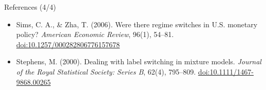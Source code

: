 \begin{frame}{References (4/4)}
\begin{itemize}
    \item Sims, C. A., \& Zha, T. (2006). Were there regime switches in U.S. monetary policy? \textit{American Economic Review}, 96(1), 54--81. \href{https://doi.org/10.1257/000282806776157678}{doi:10.1257/000282806776157678}
    \item Stephens, M. (2000). Dealing with label switching in mixture models. \textit{Journal of the Royal Statistical Society: Series B}, 62(4), 795--809. \href{https://doi.org/10.1111/1467-9868.00265}{doi:10.1111/1467-9868.00265}
\end{itemize}
\end{frame}


